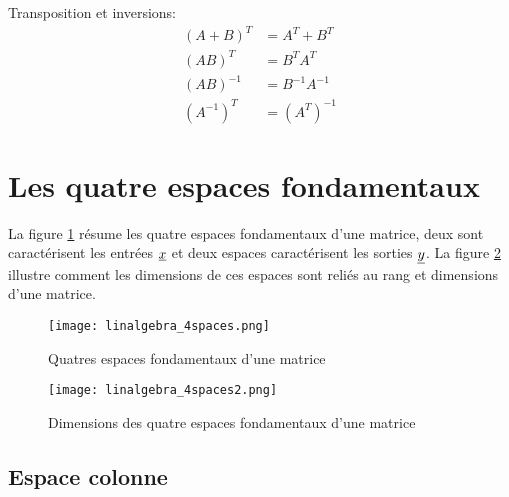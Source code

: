 Transposition et inversions:
\begin{align}
(A+B)^T &= A^T + B^T \\
(AB)^T &= B^TA^T \\
(AB)^{-1} &= B^{-1}A^{-1} \\
(A^{-1})^T &= (A^{T})^{-1} 
\end{align}



\newpage
\section{Les quatre espaces fondamentaux}
\label{sec:4espfond}

La figure \ref{fig:4spaces} résume les quatre espaces fondamentaux d'une matrice, deux sont caractérisent les entrées $\underline{x}$ et deux espaces caractérisent les sorties $\underline{y}$. La figure \ref{fig:4spaces2} illustre comment les dimensions de ces espaces sont reliés au rang et dimensions d'une matrice.

\begin{figure}[H]
	\centering
		\texttt{[image: linalgebra\_4spaces.png]}
	\caption{Quatres espaces fondamentaux d'une matrice}
	\label{fig:4spaces}
\end{figure}

\begin{figure}[H]
	\centering
		\texttt{[image: linalgebra\_4spaces2.png]}
	\caption{Dimensions des quatre espaces fondamentaux d'une matrice}
	\label{fig:4spaces2}
\end{figure}


\subsection{Espace colonne}
\label{sec:espcol}

